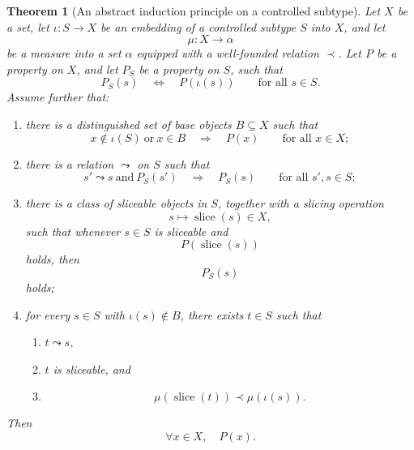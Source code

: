 \documentclass[pdflatex,sn-mathphys-num]{sn-jnl}%
\theoremstyle{thmstyleone}%
\newtheorem{theorem}{Theorem}%
\theoremstyle{thmstyletwo}%
\theoremstyle{thmstylethree}%
\begin{document}
\begin{theorem}[An abstract induction principle on a controlled subtype]
\label{thm:abstract-subtype-induction}
Let $X$ be a set, let $\iota : S \to X$ be an embedding of a controlled subtype $S$ into $X$, and let
\[
\mu : X \to \alpha
\]
be a measure into a set $\alpha$ equipped with a well-founded relation $\prec$. Let $P$ be a property on $X$, and let $P_S$ be a property on $S$, such that
\[
P_S(s)\quad \Longleftrightarrow \quad P(\iota(s))
\qquad
\text{for all } s \in S.
\]
Assume further that:
\begin{enumerate}
  \item there is a distinguished set of base objects $B \subseteq X$ such that
  \[
  x \notin \iota(S)\ \text{or}\ x \in B
  \quad \Longrightarrow \quad
  P(x)
  \qquad
  \text{for all } x \in X;
  \]
  \item there is a relation $\leadsto$ on $S$ such that
  \[
  s' \leadsto s \ \text{and}\ P_S(s')
  \quad \Longrightarrow \quad
  P_S(s)
  \qquad
  \text{for all } s',s \in S;
  \]
  \item there is a class of sliceable objects in $S$, together with a slicing operation
  \[
  s \longmapsto \operatorname{slice}(s) \in X,
  \]
  such that whenever $s \in S$ is sliceable and
  \[
  P(\operatorname{slice}(s))
  \]
  holds, then
  \[
  P_S(s)
  \]
  holds;
  \item for every $s \in S$ with $\iota(s) \notin B$, there exists $t \in S$ such that
  \begin{enumerate}
    \item $t \leadsto s$,
    \item $t$ is sliceable, and
    \item
    \[
    \mu(\operatorname{slice}(t)) \prec \mu(\iota(s)).
    \]
  \end{enumerate}
\end{enumerate}
Then
\[
\forall x \in X,\quad P(x).
\]
\end{theorem}
\end{document}
